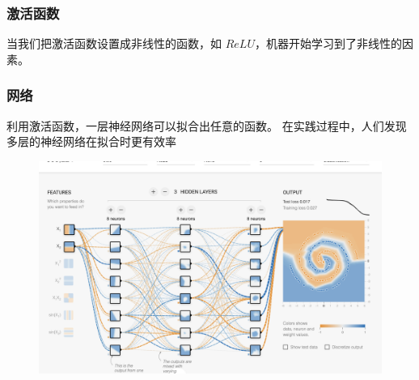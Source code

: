 \begin{frame}
    \frametitle{激活函数}
    当我们把激活函数设置成非线性的函数，如 $ReLU$，机器开始学习到了非线性的因素。
\end{frame}
\begin{frame}
    \frametitle{网络}
    利用激活函数，一层神经网络可以拟合出任意的函数。
    在实践过程中，人们发现多层的神经网络在拟合时更有效率
    \begin{figure}[hb]
        \includegraphics[width=0.7\linewidth]{../lib/final.png}
    \end{figure}
\end{frame}
